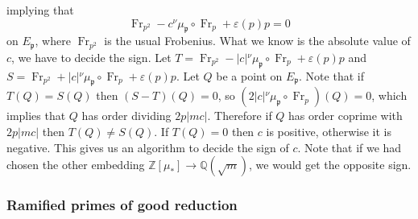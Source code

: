 \documentclass[11pt]{amsart}
\theoremstyle{definition}
\begin{document}
		implying that
		\begin{equation}\label{inert}
		\operatorname{Fr}_{p^2}-c{{}^\nu\!}\mu_{\mathfrak{p}}\circ\operatorname{Fr}_p+\varepsilon(p)p=0
		\end{equation}
		on $E_{\mathfrak{p}}$, where $\operatorname{Fr}_{p^2}$ is the usual Frobenius. What we know is the absolute value of $c$, we have to decide the sign. Let $T=\operatorname{Fr}_{p^2}-|c|{{}^\nu\!}\mu_{\mathfrak{p}}\circ\operatorname{Fr}_p+\varepsilon(p)p$ and $S=\operatorname{Fr}_{p^2}+|c|{{}^\nu\!}\mu_{\mathfrak{p}}\circ\operatorname{Fr}_p+\varepsilon(p)p$. Let $Q$ be a point on $E_{\mathfrak{p}}$. Note that if $T(Q)=S(Q)$ then $(S-T)(Q)=0$, so $(2|c|{{}^\nu\!}\mu_{\mathfrak{p}}\circ\operatorname{Fr}_p)(Q)=0$, which implies that $Q$ has order dividing $2p|mc|$. Therefore if $Q$ has order coprime with $2p|mc|$ then $T(Q)\neq S(Q)$. If $T(Q)=0$ then $c$ is positive, otherwise it is negative. This gives us an algorithm to decide the sign of $c$. Note that if we had chosen the other embedding ${\mathbb{Z}}[\mu_*]\to {\mathbb{Q}}(\sqrt{m})$, we would get the opposite sign.

\subsubsection*{Ramified primes of good reduction}
\end{document}
